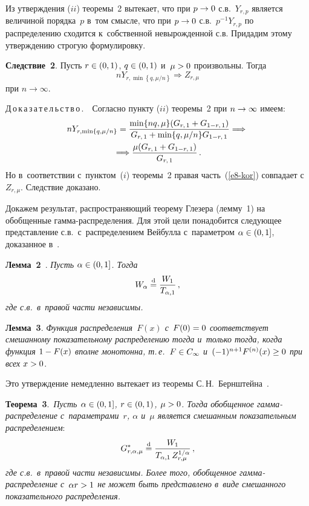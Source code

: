 \begin{multicols}{2}
\smallskip

Из утверждения ($ii$) теоремы~2 вытекает, что при $p\hm\to0$ с.в.~$Y_{r,p}$ 
является величиной порядка~$p$ в~том смысле, что при
$p\hm\to0$ с.в.~$p^{-1}Y_{r,p}$ по распределению сходится 
к~собственной невырожденной с.в. Придадим этому утверждению строгую
формулировку.

\smallskip

\noindent
\textbf{Следствие~2}. Пусть $r\hm\in(0,1)$, $q\hm\in(0,1)$ и~$\mu\hm>0$
произвольны. Тогда
$$
nY_{r,\min\left\{q,\mu/n\right\}}\Longrightarrow Z_{r,\mu}
$$
при $n\to\infty$.

\smallskip

\noindent
Д\,о\,к\,а\,з\,а\,т\,е\,л\,ь\,с\,т\,в\,о\,.\ \ 
Согласно пункту ($ii$) теоремы~2 при
$n\hm\to\infty$ имеем:
\begin{multline}
nY_{r,\min\left\{q,{\mu}/{n}\right\}}=
\displaystyle\frac{\displaystyle \min\{nq,\mu\}(G_{r,\,1}+G_{1-r,\,1})\mathstrut}{\displaystyle G_{r,\,1}+\min\{q,{\mu}/{n}\}G_{1-r,\,1}\mathstrut}\Longrightarrow{}\\
{}\Longrightarrow
\displaystyle\frac{\displaystyle \mu(G_{r,\,1}+G_{1-r,\,1})\mathstrut}{\displaystyle G_{r,\,1}\mathstrut}\,.\label{e8-kor}
\end{multline}
Но в~соответствии с~пунктом~($i$) теоремы~2 правая часть~(\ref{e8-kor})
совпадает с~$Z_{r,\mu}$. Следствие доказано.

\smallskip

Докажем результат, распространяющий теорему Глезера (лемму~1) на
обобщенные гам\-ма-рас\-пре\-де\-ле\-ния. Для этой цели понадобится следующее
представление с.в.\ с~распределением Вейбулла с~параметром
$\alpha\hm\in(0,1]$, доказанное в~\cite{KorolevWeibull2016}.

\smallskip

\noindent
\textbf{Лемма~2}~\cite{KorolevWeibull2016}. \textit{Пусть
$\alpha\hm\in(0,1]$. Тогда}
$$
W_{\alpha}\stackrel{\mathrm{d}}{=}\displaystyle\frac{\displaystyle W_1\mathstrut}{\displaystyle T_{\alpha,1}\mathstrut}\,,
$$
\textit{где с.в.\ в~правой части независимы.}

\pagebreak


\noindent
\textbf{Лемма~3}. \textit{Функция распределения~$F(x)$ с~$F(0)\hm=0$ 
соответствует смешанному
показательному распределению тогда и~только тогда, когда функция
$1\hm-F(x)$ вполне монотонна, т.\,е.\ $F\hm\in C_{\infty}$ 
и~$(-1)^{n+1}F^{(n)}(x)\hm\ge 0$ при всех $x\hm>0$}.

\smallskip

Это утверждение немедленно вытекает из теоремы С.\,Н.~Бернштейна~\cite{Bernstein1928}.

\smallskip

\noindent
\textbf{Теорема~3}.\ \textit{Пусть $\alpha\hm\in(0,1]$, $r\hm\in(0,1)$, $\mu\hm>0$.
Тогда обобщенное гам\-ма-рас\-пре\-де\-ле\-ние с~параметрами~$r$, $\alpha$
и~$\mu$ является смешанным показательным распределением}:
$$
G^*_{r,\alpha,\mu}\stackrel{\mathrm{d}}{=}\displaystyle\frac{\displaystyle W_1\mathstrut}{\displaystyle T_{\alpha,1}\,Z_{r,\mu}^{1/\alpha}\mathstrut}\,,
$$
\textit{где с.в.\ в~правой части независимы. Более того, обобщенное
гам\-ма-рас\-пре\-де\-ле\-ние с~$\alpha r\hm>1$ не может быть представлено в~виде
смешанного показательного распределения.}


\end{multicols}
